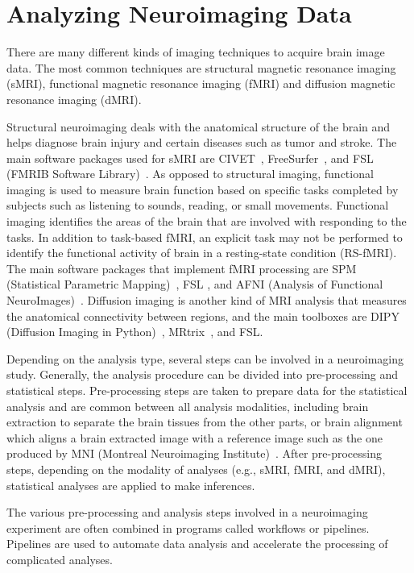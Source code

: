 \section{Analyzing Neuroimaging Data}

There are many different kinds of imaging techniques to acquire 
brain image data. The most common techniques are structural magnetic 
resonance imaging (sMRI), functional magnetic resonance imaging (fMRI) 
and diffusion magnetic resonance imaging (dMRI).

Structural neuroimaging deals with the anatomical structure of the brain and helps
diagnose brain injury and certain diseases such as tumor and stroke.
The main software packages used for sMRI are 
CIVET~\cite{ad2006civet}, FreeSurfer~\cite{fischl2012freesurfer}, and 
FSL (FMRIB Software Library)~\cite{jenkinson2012fsl}. 
As opposed to structural imaging, functional imaging is used to measure 
brain function based on 
specific tasks completed by subjects such as listening to sounds, 
reading, or small movements. 
Functional imaging identifies the areas of 
the brain that are involved with responding to the tasks. 
In addition to task-based fMRI, an explicit task may not be performed 
to identify the functional activity of brain in a resting-state 
condition (RS-fMRI). The main 
software packages that implement fMRI processing are SPM (Statistical 
Parametric Mapping)~\cite{spm}, FSL , and AFNI (Analysis of Functional 
NeuroImages)~\cite{cox1996afni}. Diffusion imaging is another kind of 
MRI analysis that measures the anatomical connectivity between 
regions, and the main toolboxes are DIPY (Diffusion Imaging in 
Python)~\cite{garyfallidis2014dipy}, MRtrix~\cite{tournier2012mrtrix}, 
and FSL.

Depending on the analysis type, several steps can be involved in a 
neuroimaging study. Generally, the analysis procedure can be divided into 
pre-processing and statistical steps. Pre-processing steps are taken 
to prepare data for the statistical analysis and are common between all 
analysis modalities, including brain extraction to separate the brain 
tissues from the other parts, or brain alignment which aligns a brain 
extracted image with a reference image such as the one produced by 
MNI (Montreal Neuroimaging Institute)~\cite{evans1992anatomical}. 
After pre-processing steps, depending on the
modality of analyses (e.g., sMRI, fMRI, and dMRI), statistical analyses 
are applied to make inferences.

The various pre-processing and analysis steps involved in a 
neuroimaging experiment are often combined in programs called workflows 
or pipelines. Pipelines are used to automate data analysis and accelerate 
the processing of complicated analyses. 


